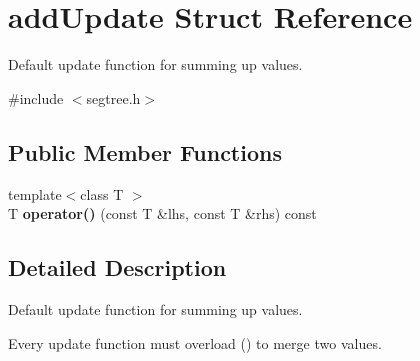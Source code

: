 \hypertarget{structadd_update}{}\section{add\+Update Struct Reference}
\label{structadd_update}


Default update function for summing up values.  




{\ttfamily \#include $<$segtree.\+h$>$}

\subsection*{Public Member Functions}
\begin{DoxyCompactItemize}
\item 
\mbox{\label{structadd_update_a15f6c3dd8fc66dd218fd893fab24799c}} 
{\footnotesize template$<$class T $>$ }\\T {\bfseries operator()} (const T \&lhs, const T \&rhs) const
\end{DoxyCompactItemize}


\subsection{Detailed Description}
Default update function for summing up values. 

Every update function must overload () to merge two values. 